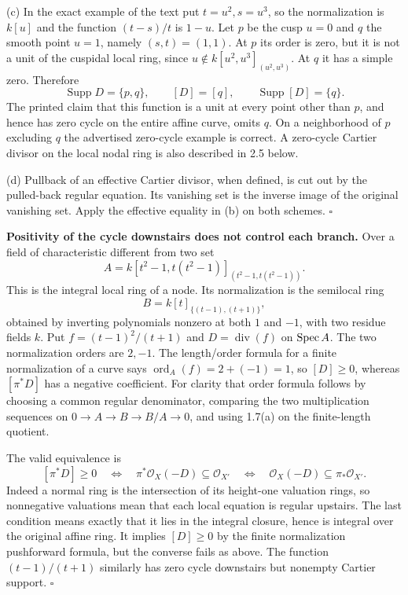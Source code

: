\documentclass[11pt]{article}
\let\chapterexercise\exercise
\renewcommand{\exercise}[2]{\Needspace{8\baselineskip}\chapterexercise{#1}{#2}}
\begin{document}
(c) In the exact example of the text put $t=u^2,s=u^3$, so the normalization is $k[u]$ and the function $(t-s)/t$ is $1-u$. Let $p$ be the cusp $u=0$ and $q$ the smooth point $u=1$, namely $(s,t)=(1,1)$. At $p$ its order is zero, but it is not a unit of the cuspidal local ring, since $u\notin k[u^2,u^3]_{(u^2,u^3)}$. At $q$ it has a simple zero. Therefore
\[ \operatorname{Supp}D=\{p,q\},\qquad [D]=[q],\qquad\operatorname{Supp}[D]=\{q\}. \]
The printed claim that this function is a unit at every point other than $p$, and hence has zero cycle on the entire affine curve, omits $q$. On a neighborhood of $p$ excluding $q$ the advertised zero-cycle example is correct. A zero-cycle Cartier divisor on the local nodal ring is also described in 2.5 below.

(d) Pullback of an effective Cartier divisor, when defined, is cut out by the pulled-back regular equation. Its vanishing set is the inverse image of the original vanishing set. Apply the effective equality in (b) on both schemes. \hfill$\square$

\pf
\textbf{Positivity of the cycle downstairs does not control each branch.} Over a field of characteristic different from two set
\[ A=k[t^2-1,t(t^2-1)]_{(t^2-1,t(t^2-1))}. \]
This is the integral local ring of a node. Its normalization is the semilocal ring
\[ B=k[t]_{\{(t-1),(t+1)\}}, \]
obtained by inverting polynomials nonzero at both $1$ and $-1$, with two residue fields $k$. Put $f=(t-1)^2/(t+1)$ and $D=\operatorname{div}(f)$ on $\operatorname{Spec} A$. The two normalization orders are $2,-1$. The length/order formula for a finite normalization of a curve says $\operatorname{ord}_A(f)=2+(-1)=1$, so $[D]\ge0$, whereas $[\pi^*D]$ has a negative coefficient. For clarity that order formula follows by choosing a common regular denominator, comparing the two multiplication sequences on $0\to A\to B\to B/A\to0$, and using 1.7(a) on the finite-length quotient.

The valid equivalence is
\[ [\pi^*D]\ge0\quad\Longleftrightarrow\quad
\pi^*\mathcal O_X(-D)\subseteq\mathcal O_{X'}\quad\Longleftrightarrow\quad
\mathcal O_X(-D)\subseteq\pi_*\mathcal O_{X'}. \]
Indeed a normal ring is the intersection of its height-one valuation rings, so nonnegative valuations mean that each local equation is regular upstairs. The last condition means exactly that it lies in the integral closure, hence is integral over the original affine ring. It implies $[D]\ge0$ by the finite normalization pushforward formula, but the converse fails as above. The function $(t-1)/(t+1)$ similarly has zero cycle downstairs but nonempty Cartier support. \hfill$\square$
\end{document}
